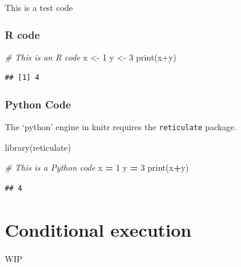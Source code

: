\documentclass[
]{book}
\newenvironment{Shaded}{\begin{snugshade}}{\end{snugshade}}
\newcommand{\BuiltInTok}[1]{#1}
\newcommand{\CommentTok}[1]{\textcolor[rgb]{0.56,0.35,0.01}{\textit{#1}}}
\newcommand{\DecValTok}[1]{\textcolor[rgb]{0.00,0.00,0.81}{#1}}
\newcommand{\FunctionTok}[1]{\textcolor[rgb]{0.00,0.00,0.00}{#1}}
\newcommand{\NormalTok}[1]{#1}
\newcommand{\OperatorTok}[1]{\textcolor[rgb]{0.81,0.36,0.00}{\textbf{#1}}}
\newcommand{\OtherTok}[1]{\textcolor[rgb]{0.56,0.35,0.01}{#1}}
\newcommand{\SpecialCharTok}[1]{\textcolor[rgb]{0.00,0.00,0.00}{#1}}
\begin{document}
This is a test code

\hypertarget{r-code}{%
\subsection{R code}\label{r-code}}

\begin{Shaded}
\begin{Highlighting}[]
\CommentTok{\# This is an R code}
\NormalTok{x }\OtherTok{\textless{}{-}} \DecValTok{1}
\NormalTok{y }\OtherTok{\textless{}{-}} \DecValTok{3}
\FunctionTok{print}\NormalTok{(x}\SpecialCharTok{+}\NormalTok{y)}
\end{Highlighting}
\end{Shaded}

\begin{verbatim}
## [1] 4
\end{verbatim}

\hypertarget{python-code}{%
\subsection{Python Code}\label{python-code}}

The `python' engine in knitr requires the \texttt{reticulate} package.

\begin{Shaded}
\begin{Highlighting}[]
\FunctionTok{library}\NormalTok{(reticulate)}
\end{Highlighting}
\end{Shaded}

\begin{Shaded}
\begin{Highlighting}[]
\CommentTok{\# This is a Python code}
\NormalTok{x }\OperatorTok{=} \DecValTok{1}
\NormalTok{y }\OperatorTok{=} \DecValTok{3}
\BuiltInTok{print}\NormalTok{(x}\OperatorTok{+}\NormalTok{y)}
\end{Highlighting}
\end{Shaded}

\begin{verbatim}
## 4
\end{verbatim}

\hypertarget{conditional-execution}{%
\chapter{Conditional execution}\label{conditional-execution}}

WIP
\end{document}
